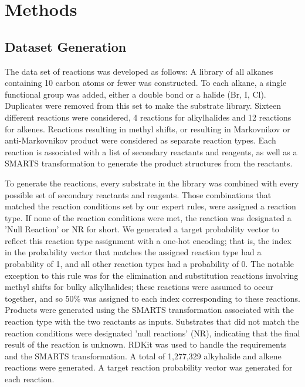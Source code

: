 \section{Methods}

\subsection{ Dataset Generation  }

The data set of reactions was developed as follows: A library of all alkanes containing 10 carbon atoms or fewer was constructed. To each alkane, a single functional group was added, either a double bond or a halide (Br, I, Cl). Duplicates were removed from this set to make the substrate library. Sixteen different reactions were considered, 4 reactions for alkylhalides and 12 reactions for alkenes. Reactions resulting in methyl shifts, or resulting in Markovnikov or anti-Markovnikov product were considered as separate reaction types. Each reaction is associated with a list of secondary reactants and reagents, as well as a SMARTS transformation to generate the product structures from the reactants. 

To generate the reactions, every substrate in the library was combined with every possible set of secondary reactants and reagents. Those combinations that matched the reaction conditions set by our expert rules, were assigned a reaction type. If none of the reaction conditions were met, the reaction was designated a 'Null Reaction' or NR for short. We generated a target probability vector to reflect this reaction type assignment with a one-hot encoding; that is, the index in the probability vector that matches the assigned reaction type had a probability of 1, and all other reaction types had a probability of 0. The notable exception to this rule was for the elimination and substitution reactions involving methyl shifts for bulky alkylhalides; these reactions were assumed to occur together, and so 50\% was assigned to each index corresponding to these reactions. Products were generated using the SMARTS transformation associated with the reaction type with the two reactants as inputs. Substrates that did not match the reaction conditions were designated 'null reactions' (NR), indicating that the final result of the reaction is unknown. RDKit \cite{rdkit} was used to handle the requirements and the SMARTS transformation. A total of 1,277,329 alkyhalide and alkene reactions were generated. A target reaction probability vector was generated for each reaction. 

